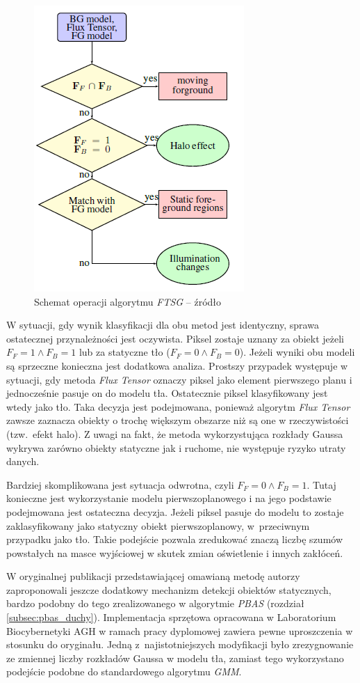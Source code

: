 		\begin{figure}[h]
				\centering
				\includegraphics[scale=0.8]{img/3/ftsg_flow.png}
				\caption{Schemat operacji algorytmu \textit{FTSG} -- źródło \cite{wang_14}}
				\label{fig:ftsg_flow}
		\end{figure}

W sytuacji, gdy wynik klasyfikacji dla obu metod jest identyczny, sprawa ostatecznej przynależności jest oczywista. 
Piksel zostaje uznany za obiekt jeżeli $F_F = 1 \land F_B = 1$ lub za statyczne tło ($F_F = 0 \land F_B = 0$). 
Jeżeli wyniki obu modeli są sprzeczne konieczna jest dodatkowa analiza. 
Prostszy przypadek występuje w sytuacji, gdy metoda \textit{Flux Tensor} oznaczy piksel jako element pierwszego planu i jednocześnie pasuje on do modelu tła. 
Ostatecznie piksel klasyfikowany jest wtedy jako tło. 
Taka decyzja jest podejmowana, ponieważ algorytm \textit{Flux Tensor} zawsze zaznacza obiekty o trochę większym obszarze niż są one w rzeczywistości (tzw.~efekt halo). 
Z uwagi na fakt, że metoda wykorzystująca rozkłady Gaussa wykrywa zarówno obiekty statyczne jak i ruchome, nie występuje ryzyko utraty danych.

Bardziej skomplikowana jest sytuacja odwrotna, czyli $F_F = 0 \land F_B = 1$. 
Tutaj konieczne jest wykorzystanie modelu pierwszoplanowego i na jego podstawie podejmowana jest ostateczna decyzja. 
Jeżeli piksel pasuje do modelu to zostaje zaklasyfikowany jako statyczny obiekt pierwszoplanowy, w~przeciwnym przypadku jako tło. 
Takie podejście pozwala zredukować znaczą liczbę szumów powstałych na masce wyjściowej w skutek zmian oświetlenie i innych zakłóceń.

W oryginalnej publikacji przedstawiającej omawianą metodę \cite{wang_14} autorzy zaproponowali jeszcze dodatkowy mechanizm detekcji obiektów statycznych, bardzo podobny do tego zrealizowanego w algorytmie \textit{PBAS} (rozdział \ref{subsec:pbas_duchy}). 
Implementacja sprzętowa opracowana w Laboratorium Biocybernetyki AGH w ramach pracy dyplomowej \cite{janus_15} zawiera pewne uproszczenia w stosunku do oryginału. 
Jedną z~najistotniejszych modyfikacji było zrezygnowanie ze zmiennej liczby rozkładów Gaussa w modelu tła, zamiast tego wykorzystano podejście podobne do standardowego algorytmu \textit{GMM}.